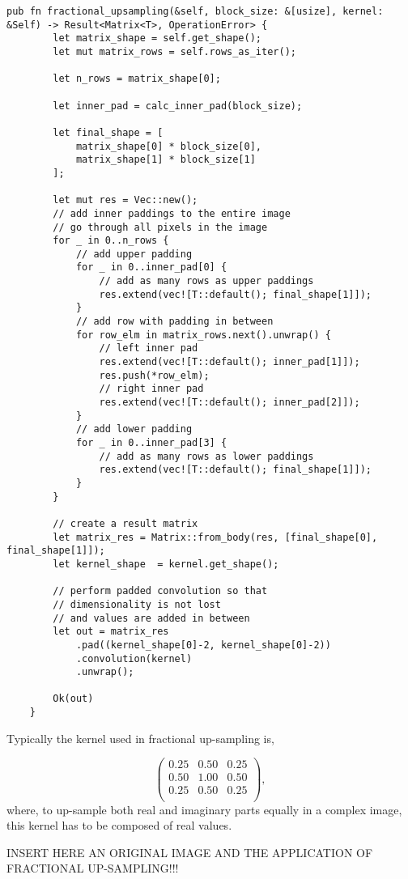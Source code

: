 \begin{lstlisting}[caption=Implementation in Rust of Fractional Up-Sampling.]
	pub fn fractional_upsampling(&self, block_size: &[usize], kernel: &Self) -> Result<Matrix<T>, OperationError> {
		let matrix_shape = self.get_shape();
		let mut matrix_rows = self.rows_as_iter();
		
		let n_rows = matrix_shape[0];
		
		let inner_pad = calc_inner_pad(block_size);
		
		let final_shape = [
			matrix_shape[0] * block_size[0], 
			matrix_shape[1] * block_size[1]
		];
		
		let mut res = Vec::new();
		// add inner paddings to the entire image
		// go through all pixels in the image
		for _ in 0..n_rows {
			// add upper padding
			for _ in 0..inner_pad[0] {
				// add as many rows as upper paddings
				res.extend(vec![T::default(); final_shape[1]]);
			}
			// add row with padding in between
			for row_elm in matrix_rows.next().unwrap() {
				// left inner pad
				res.extend(vec![T::default(); inner_pad[1]]);
				res.push(*row_elm);
				// right inner pad
				res.extend(vec![T::default(); inner_pad[2]]);
			}
			// add lower padding
			for _ in 0..inner_pad[3] {
				// add as many rows as lower paddings
				res.extend(vec![T::default(); final_shape[1]]);
			}
		}
		
		// create a result matrix
		let matrix_res = Matrix::from_body(res, [final_shape[0], final_shape[1]]);
		let kernel_shape  = kernel.get_shape();
		
		// perform padded convolution so that 
		// dimensionality is not lost
		// and values are added in between
		let out = matrix_res
			.pad((kernel_shape[0]-2, kernel_shape[0]-2))
			.convolution(kernel)
			.unwrap();
		
		Ok(out)
	}
\end{lstlisting}

Typically the kernel used in fractional up-sampling is,

\[
\begin{pmatrix}
	0.25 & 0.50 & 0.25 \\
	0.50 & 1.00 & 0.50 \\
	0.25 & 0.50 & 0.25 \\
\end{pmatrix},
\]
where, to up-sample both real and imaginary parts equally in a complex image, this kernel has to be composed of real values.

INSERT HERE AN ORIGINAL IMAGE AND THE APPLICATION OF FRACTIONAL UP-SAMPLING!!!

